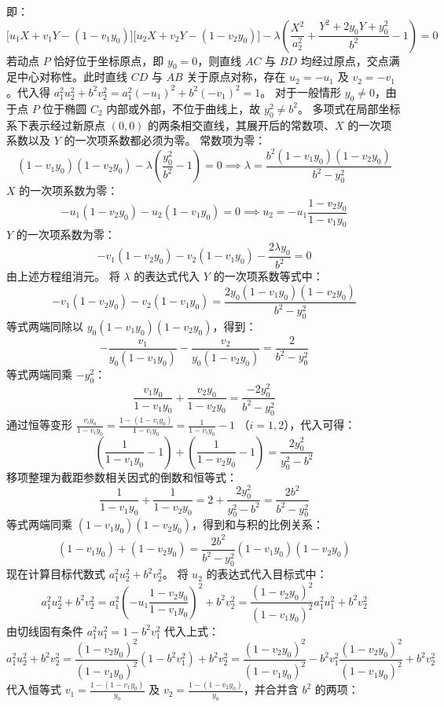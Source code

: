 \begin{solution}
即：
$$ \big[u_1 X + v_1 Y - (1 - v_1 y_0)\big]\big[u_2 X + v_2 Y - (1 - v_2 y_0)\big] - \lambda \left( \frac{X^2}{a_2^2} + \frac{Y^2 + 2y_0 Y + y_0^2}{b^2} - 1 \right) = 0 $$
若动点 $P$ 恰好位于坐标原点，即 $y_0 = 0$，则直线 $AC$ 与 $BD$ 均经过原点，交点满足中心对称性。此时直线 $CD$ 与 $AB$ 关于原点对称，存在 $u_2 = -u_1$ 及 $v_2 = -v_1$。代入得 $a_1^2 u_2^2 + b^2 v_2^2 = a_1^2 (-u_1)^2 + b^2 (-v_1)^2 = 1$。
对于一般情形 $y_0 \neq 0$，由于点 $P$ 位于椭圆 $C_2$ 内部或外部，不位于曲线上，故 $y_0^2 \neq b^2$。
多项式在局部坐标系下表示经过新原点 $(0,0)$ 的两条相交直线，其展开后的常数项、$X$ 的一次项系数以及 $Y$ 的一次项系数都必须为零。
常数项为零：
$$ (1 - v_1 y_0)(1 - v_2 y_0) - \lambda \left( \frac{y_0^2}{b^2} - 1 \right) = 0 \implies \lambda = \frac{b^2 (1 - v_1 y_0)(1 - v_2 y_0)}{b^2 - y_0^2} $$
$X$ 的一次项系数为零：
$$ -u_1 (1 - v_2 y_0) - u_2 (1 - v_1 y_0) = 0 \implies u_2 = -u_1 \frac{1 - v_2 y_0}{1 - v_1 y_0} $$
$Y$ 的一次项系数为零：
$$ -v_1 (1 - v_2 y_0) - v_2 (1 - v_1 y_0) - \frac{2\lambda y_0}{b^2} = 0 $$
由上述方程组消元。
将 $\lambda$ 的表达式代入 $Y$ 的一次项系数等式中：
$$ -v_1 (1 - v_2 y_0) - v_2 (1 - v_1 y_0) = \frac{2 y_0 (1 - v_1 y_0)(1 - v_2 y_0)}{b^2 - y_0^2} $$
等式两端同除以 $y_0 (1 - v_1 y_0)(1 - v_2 y_0)$，得到：
$$ -\frac{v_1}{y_0 (1 - v_1 y_0)} - \frac{v_2}{y_0 (1 - v_2 y_0)} = \frac{2}{b^2 - y_0^2} $$
等式两端同乘 $-y_0^2$：
$$ \frac{v_1 y_0}{1 - v_1 y_0} + \frac{v_2 y_0}{1 - v_2 y_0} = \frac{-2 y_0^2}{b^2 - y_0^2} $$
通过恒等变形 $\frac{v_i y_0}{1 - v_i y_0} = \frac{1 - (1 - v_i y_0)}{1 - v_i y_0} = \frac{1}{1 - v_i y_0} - 1$ （$i=1,2$），代入可得：
$$ \left( \frac{1}{1 - v_1 y_0} - 1 \right) + \left( \frac{1}{1 - v_2 y_0} - 1 \right) = \frac{2 y_0^2}{y_0^2 - b^2} $$
移项整理为截距参数相关因式的倒数和恒等式：
$$ \frac{1}{1 - v_1 y_0} + \frac{1}{1 - v_2 y_0} = 2 + \frac{2 y_0^2}{y_0^2 - b^2} = \frac{2 b^2}{b^2 - y_0^2} $$
等式两端同乘 $(1 - v_1 y_0)(1 - v_2 y_0)$，得到和与积的比例关系：
$$ (1 - v_1 y_0) + (1 - v_2 y_0) = \frac{2 b^2}{b^2 - y_0^2} (1 - v_1 y_0)(1 - v_2 y_0) $$
现在计算目标代数式 $a_1^2 u_2^2 + b^2 v_2^2$。
将 $u_2$ 的表达式代入目标式中：
$$ a_1^2 u_2^2 + b^2 v_2^2 = a_1^2 \left( -u_1 \frac{1 - v_2 y_0}{1 - v_1 y_0} \right)^2 + b^2 v_2^2 = \frac{(1 - v_2 y_0)^2}{(1 - v_1 y_0)^2} a_1^2 u_1^2 + b^2 v_2^2 $$
由切线固有条件 $a_1^2 u_1^2 = 1 - b^2 v_1^2$ 代入上式：
$$ a_1^2 u_2^2 + b^2 v_2^2 = \frac{(1 - v_2 y_0)^2}{(1 - v_1 y_0)^2} (1 - b^2 v_1^2) + b^2 v_2^2 = \frac{(1 - v_2 y_0)^2}{(1 - v_1 y_0)^2} - b^2 v_1^2 \frac{(1 - v_2 y_0)^2}{(1 - v_1 y_0)^2} + b^2 v_2^2 $$
代入恒等式 $v_1 = \frac{1 - (1 - v_1 y_0)}{y_0}$ 及 $v_2 = \frac{1 - (1 - v_2 y_0)}{y_0}$，并合并含 $b^2$ 的两项：

\end{solution}
